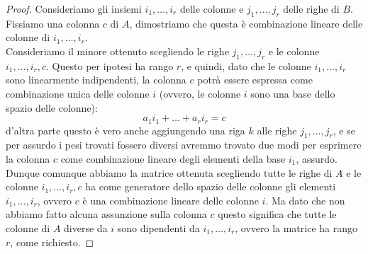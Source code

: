 \documentclass[11pt]{scrartcl}
\begin{document}
   	 \begin{proof}
   	 	Consideriamo gli insiemi $i_1,\dots,i_r$ delle colonne e $j_1,\dots,j_r$ delle righe di $B$. Fissiamo una colonna $c$ di $A$, dimostriamo che questa è combinazione lineare delle colonne di $i_1,\dots,i_r$. \\
   	 	Consideriamo il minore ottenuto scegliendo le righe $j_1,\dots,j_r$ e le colonne $i_1,\dots,i_r,c$. Questo per ipotesi ha rango $r$, e quindi, dato che le colonne $i_1,\dots,i_r$ sono linearmente indipendenti, la colonna $c$ potrà essere espressa come combinazione unica delle colonne $i$ (ovvero, le colonne $i$ sono una base dello spazio delle colonne):
   	 	$$a_1i_1+\dots+a_ri_r=c$$
   	 	d'altra parte questo è vero anche aggiungendo una riga $k$ alle righe $j_1,\dots,j_r$, e se per assurdo i pesi trovati fossero diversi avremmo trovato due modi per esprimere la colonna $c$ come combinazione lineare degli elementi della base $i_1$, assurdo. Dunque comunque abbiamo la matrice ottenuta scegliendo tutte le righe di $A$ e le colonne $i_1,\dots,i_r,c$ ha come generatore dello spazio delle colonne gli elementi $i_1,\dots,i_r$, ovvero $c$ è una combinazione lineare delle colonne $i$. Ma dato che non abbiamo fatto alcuna assunzione sulla colonna $c$ questo significa che tutte le colonne di $A$ diverse da $i$ sono dipendenti da $i_1,\dots,i_r$, ovvero la matrice ha rango $r$, come richiesto.
   	 \end{proof}
   	 
   	 \newpage
   	 
\end{document}
